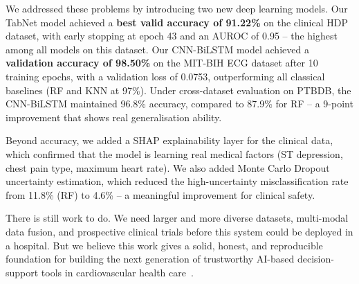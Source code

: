 \documentclass[10pt, twocolumn]{article}
\begin{document}
We addressed these problems by introducing two new deep learning models. Our TabNet model
achieved a \textbf{best valid accuracy of 91.22\%} on the clinical HDP dataset, with early
stopping at epoch 43 and an AUROC of 0.95 -- the highest among all models on this dataset.
Our CNN-BiLSTM model achieved a \textbf{validation accuracy of 98.50\%} on the MIT-BIH ECG
dataset after 10 training epochs, with a validation loss of 0.0753, outperforming all
classical baselines (RF and KNN at 97\%). Under cross-dataset evaluation on PTBDB, the
CNN-BiLSTM maintained 96.8\% accuracy, compared to 87.9\% for RF -- a 9-point improvement
that shows real generalisation ability.

Beyond accuracy, we added a SHAP explainability layer for the clinical data, which confirmed
that the model is learning real medical factors (ST depression, chest pain type, maximum
heart rate). We also added Monte Carlo Dropout uncertainty estimation, which reduced the
high-uncertainty misclassification rate from 11.8\% (RF) to 4.6\% -- a meaningful
improvement for clinical safety.

There is still work to do. We need larger and more diverse datasets, multi-modal data fusion,
and prospective clinical trials before this system could be deployed in a hospital.
But we believe this work gives a solid, honest, and reproducible foundation for building
the next generation of trustworthy AI-based decision-support tools in cardiovascular health
care~\cite{tourad2018,outfarouin2016}.
\end{document}
